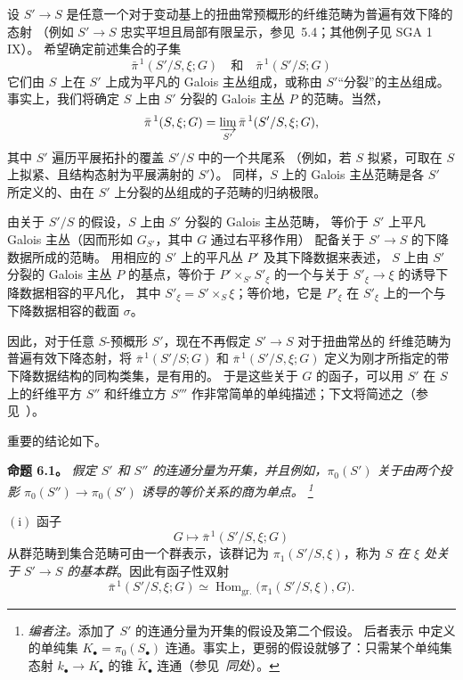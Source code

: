 设 \(S'\to S\) 是任意一个对于变动基上的扭曲常预概形的纤维范畴为普遍有效下降的态射
（例如 \(S'\to S\) 忠实平坦且局部有限呈示，参见\ 5.4；其他例子见 SGA 1 IX）。
希望确定前述集合的子集
\[
  \bar\pi^{\,1}(S'/S,\xi;G)
  \quad\text{和}\quad
  \bar\pi^{\,1}(S'/S;G)
\]
它们由 \(S\) 上在 \(S'\) 上成为平凡的 Galois 主丛组成，或称由 \(S'\)“分裂”的主丛组成。
事实上，我们将确定 \(S\) 上由 \(S'\) 分裂的 Galois 主丛 \(P\) 的范畴。当然，
\[
  \bar\pi^{\,1}(S,\xi;G)
  =
  \varinjlim_{S'}\bar\pi^{\,1}(S'/S,\xi;G),
\]
其中 \(S'\) 遍历平展拓扑的覆盖 \(S'/S\) 中的一个共尾系
（例如，若 \(S\) 拟紧，可取在 \(S\) 上拟紧、且结构态射为平展满射的 \(S'\)）。
同样，\(S\) 上的 Galois 主丛范畴是各 \(S'\) 所定义的、由在 \(S'\) 上分裂的丛组成的子范畴的归纳极限。

由关于 \(S'/S\) 的假设，\(S\) 上由 \(S'\) 分裂的 Galois 主丛范畴，
等价于 \(S'\) 上平凡 Galois 主丛（因而形如 \(G_{S'}\)，其中 \(G\) 通过右平移作用）
配备关于 \(S'\to S\) 的下降数据所成的范畴。
用相应的 \(S'\) 上的平凡丛 \(P'\) 及其下降数据来表述，
\(S\) 上由 \(S'\) 分裂的 Galois 主丛 \(P\) 的基点，等价于
\(P'\times_{S'}S'_\xi\) 的一个与关于 \(S'_\xi\to\xi\) 的诱导下降数据相容的平凡化，
其中 \(S'_\xi=S'\times_S\xi\)；等价地，它是 \(P'_\xi\) 在 \(S'_\xi\)
上的一个与下降数据相容的截面 \(\sigma\)。

因此，对于任意 \(S\)-预概形 \(S'\)，现在不再假定 \(S'\to S\) 对于扭曲常丛的
纤维范畴为普遍有效下降态射，将 \(\bar\pi^{\,1}(S'/S;G)\) 和
\(\bar\pi^{\,1}(S'/S,\xi;G)\) 定义为刚才所指定的带下降数据结构的同构类集，是有用的。
于是这些关于 \(G\) 的函子，可以用 \(S'\) 在 \(S\) 上的纤维平方 \(S''\)
和纤维立方 \(S'''\) 作非常简单的单纯描述；下文将简述之（参见\ ）。

重要的结论如下。

\par\medskip\noindent
\textbf{命题 6.1。}\enspace
\begingroup\itshape
假定 \(S'\) 和 \(S''\) 的连通分量为开集，并且例如，\(\pi_0(S')\)
关于由两个投影 \(\pi_0(S'')\to\pi_0(S')\) 诱导的等价关系的商为单点。
\footnote{\textit{编者注。}添加了 \(S'\) 的连通分量为开集的假设及第二个假设。
后者表示  中定义的单纯集
\(K_\bullet=\pi_0(S_\bullet)\) 连通。事实上，更弱的假设就够了：只需某个单纯集态射
\(k_\bullet\to K_\bullet\) 的锥 \(\widetilde K_\bullet\) 连通（参见\ \emph{同处}）。}

\smallskip
\noindent
\(\mathrm{(i)}\) 函子
\[
  G\longmapsto\bar\pi^{\,1}(S'/S,\xi;G)
\]
从群范畴到集合范畴可由一个群表示，该群记为 \(\pi_1(S'/S,\xi)\)，称为
\emph{\(S\) 在 \(\xi\) 处关于 \(S'\to S\) 的基本群}。因此有函子性双射
\[
  \bar\pi^{\,1}(S'/S,\xi;G)
  \simeq
  \operatorname{Hom}_{\mathrm{gr.}}\bigl(\pi_1(S'/S,\xi),G\bigr).
\]

